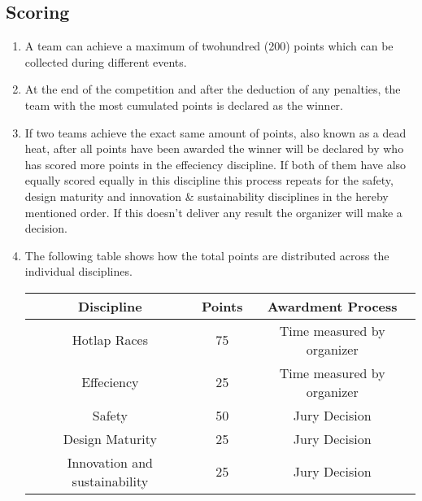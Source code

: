     \subsection{Scoring}
    \begin{enumerate}
      \item A team can achieve a maximum of twohundred (200) points which can be collected during different events.
      \item At the end of the competition and after the deduction of any penalties, the team with the most cumulated points is declared as the winner. 
      \item If two teams achieve the exact same amount of points, also known as a dead heat, after all points have been awarded the winner will be declared by who has scored more points in the effeciency discipline. 
      If both of them have also equally scored equally in this discipline this process repeats for the safety, design maturity and innovation \& sustainability disciplines in the hereby mentioned order. If this doesn't deliver any result the organizer will make a decision. 
      \item The following table shows how the total points are distributed across the individual disciplines. 

      \begin{center}
        \begin{tabular}{|c|c|c|} 
          \hline
          Discipline & Points & Awardment Process \\ 
          \hline
          Hotlap Races & 75 & Time measured by organizer \\ 
          \hline
          Effeciency & 25 & Time measured by organizer \\ 
          \hline
          Safety & 50 & Jury Decision \\ 
          \hline
          Design Maturity & 25 & Jury Decision \\ 
          \hline
          Innovation and sustainability & 25 & Jury Decision \\ 
          \hline
        \end{tabular}
      \end{center}
    \end{enumerate}

